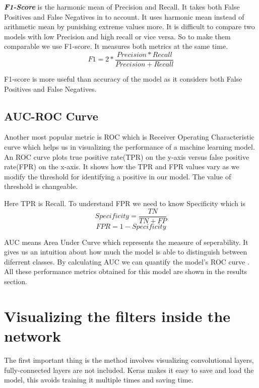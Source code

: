 \noindent \textit{\textbf{F1-Score}} is the harmonic mean of Precision and Recall. It takes both False Positives and False Negatives in to account. It uses harmonic mean instead of arithmetic mean by punishing extreme values more. It is difficult to compare two models with low Precision and high recall or vice versa. So to make them comparable we use F1-score. It measures both metrics at the same time.
$$F1 = 2* \frac{Precision*Recall}{Precision+Recall} $$

\noindent F1-score is more useful than accuracy of the model as it considers both False Positives and False Negatives. \cite{scikit-learn}







\subsection{AUC-ROC Curve}
Another most popular metric is ROC which is Receiver Operating Characteristic curve which helps us in visualizing the performance of a machine learning model. An ROC curve plots true positive rate(TPR) on the y-axis versus false positive rate(FPR) on the x-axis. It shows how the TPR and FPR values vary as we modify the threshold for identifying a positive in our model. The value of threshold is changeable.

\noindent Here TPR is Recall. To understand FPR we need to know Specificity which is 
$$ Specificity = \frac{TN}{TN+FP} $$
$$ FPR = 1 - Specificity$$

\noindent AUC means Area Under Curve which represents the measure of seperability. It gives us an intuition about how much the model is able to distinguish between diferrent classes. By calculating AUC we can quantify the model's ROC curve \cite{Yang}. All these performance metrics obtained for this model are shown in the results section.
 


\section{Visualizing the filters inside the network}
The first important thing is the method involves visualizing convolutional layers, fully-connected layers are not included. Keras makes it easy to save and load the model, this avoids training it multiple times and saving time.


